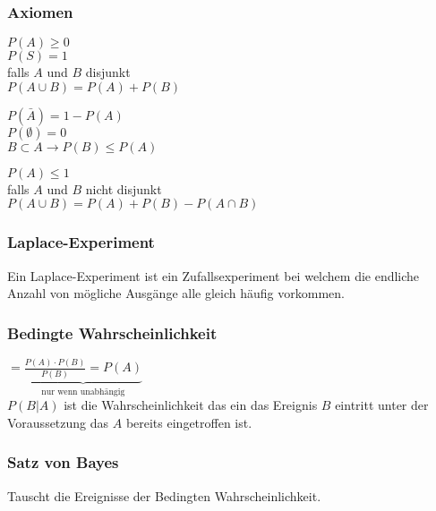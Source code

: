 \subsubsection{Axiomen}
\begin{minipage}[t]{0.32\textwidth}
	$P(A)\ge 0$\\
	$P(S) = 1$\\[4pt]
	falls $A$ und $B$ disjunkt\\
	$P(A \cup B) = P(A) + P(B)$ 
\end{minipage}
\begin{minipage}[t]{0.32\textwidth}
	$P(\bar{A}) = 1 - P(A)$\\
	$P(\emptyset) = 0$\\
	$B \subset A \rightarrow P(B) \le P(A)$
\end{minipage}
\begin{minipage}[t]{0.35\textwidth}
	$P(A) \le 1$\\[4pt]
	falls $A$ und $B$ nicht disjunkt\\
	$P(A \cup B) = P(A) + P(B) - P(A \cap B)$ 
\end{minipage}

\subsubsection{Laplace-Experiment}
\begin{multicols}{2}
	Ein Laplace-Experiment ist ein Zufallsexperiment bei welchem die endliche Anzahl von mögliche Ausgänge alle gleich häufig vorkommen.\\
	\columnbreak
	\begin{center}
	\end{center}
\end{multicols}


\subsubsection{Bedingte Wahrscheinlichkeit}
\begin{multicols}{2}
	 $=\underbrace{\frac{P(A) \cdot P(B)}{P(B)}=P(A)}_{\text{nur wenn unabhängig}}$
	\columnbreak\\
	$P(B|A)$ ist die Wahrscheinlichkeit das ein das Ereignis $B$ eintritt unter der Voraussetzung das $A$ bereits eingetroffen ist.
\end{multicols}

\subsubsection{Satz von Bayes}
\begin{minipage}{0.58\textwidth}
Tauscht die Ereignisse der Bedingten Wahrscheinlichkeit.
\end{minipage}
\hspace{0.04\textwidth}
\begin{minipage}{0.38\textwidth}
	\begin{center}
	\end{center}
\end{minipage}

